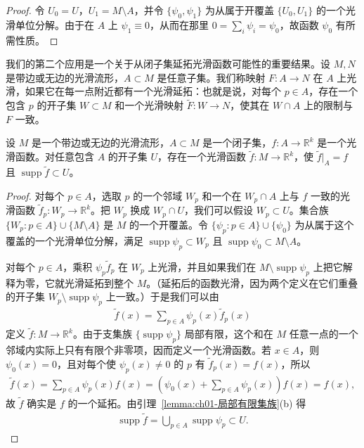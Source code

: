 \documentclass[../../main.tex]{subfiles}
\begin{document}
\begin{proof}
令 $U_{0}=U$，$U_{1}=M\setminus A$，并令 $\{\psi_{0},\psi_{1}\}$ 为从属于开覆盖 $\{U_{0},U_{1}\}$ 的一个光滑单位分解。由于在 $A$ 上 $\psi_{1}\equiv 0$，从而在那里 $0=\sum_{i}\psi_{i}=\psi_{0}$，故函数 $\psi_{0}$ 有所需性质。
\end{proof}

我们的第二个应用是一个关于从闭子集延拓光滑函数可能性的重要结果。设 $M,N$ 是带边或无边的光滑流形，$A\subset M$ 是任意子集。我们称映射 $F:A\to N$ 在 $A$ 上光滑，如果它在每一点附近都有一个光滑延拓：也就是说，对每个 $p\in A$，存在一个包含 $p$ 的开子集 $W\subset M$ 和一个光滑映射 $\widetilde{F}:W\to N$，使其在 $W\cap A$ 上的限制与 $F$ 一致。

\begin{lemma}[光滑函数的延拓引理]\label{lemma:ch02-延拓引理}
设 $M$ 是一个带边或无边的光滑流形，$A\subset M$ 是一个闭子集，$f:A\to\mathbb{R}^{k}$ 是一个光滑函数。对任意包含 $A$ 的开子集 $U$，存在一个光滑函数 $\widetilde{f}:M\to\mathbb{R}^{k}$，使 $\widetilde{f}|_{A}=f$ 且 $\operatorname{supp}\widetilde{f}\subset U$。
\end{lemma}

\begin{proof}
对每个 $p\in A$，选取 $p$ 的一个邻域 $W_{p}$ 和一个在 $W_{p}\cap A$ 上与 $f$ 一致的光滑函数 $\widetilde{f}_{p}:W_{p}\to\mathbb{R}^{k}$。把 $W_{p}$ 换成 $W_{p}\cap U$，我们可以假设 $W_{p}\subset U$。集合族 $\{W_{p}:p\in A\}\cup\{M\setminus A\}$ 是 $M$ 的一个开覆盖。令 $\{\psi_{p}:p\in A\}\cup\{\psi_{0}\}$ 为从属于这个覆盖的一个光滑单位分解，满足 $\operatorname{supp}\psi_{p}\subset W_{p}$ 且 $\operatorname{supp}\psi_{0}\subset M\setminus A$。

对每个 $p\in A$，乘积 $\psi_{p}\widetilde{f}_{p}$ 在 $W_{p}$ 上光滑，并且如果我们在 $M\setminus\operatorname{supp}\psi_{p}$ 上把它解释为零，它就光滑延拓到整个 $M$。（延拓后的函数光滑，因为两个定义在它们重叠的开子集 $W_{p}\setminus\operatorname{supp}\psi_{p}$ 上一致。）于是我们可以由
\begin{align*}
\widetilde{f}(x)=\sum_{p\in A}\psi_{p}(x)\widetilde{f}_{p}(x)
\end{align*}
定义 $\widetilde{f}:M\to\mathbb{R}^{k}$。由于支集族 $\{\operatorname{supp}\psi_{p}\}$ 局部有限，这个和在 $M$ 任意一点的一个邻域内实际上只有有限个非零项，因而定义一个光滑函数。若 $x\in A$，则 $\psi_{0}(x)=0$，且对每个使 $\psi_{p}(x)\neq 0$ 的 $p$ 有 $\widetilde{f}_{p}(x)=f(x)$，所以
\begin{align*}
\widetilde{f}(x)=\sum_{p\in A}\psi_{p}(x)f(x)=\left(\psi_{0}(x)+\sum_{p\in A}\psi_{p}(x)\right)f(x)=f(x),
\end{align*}
故 $\widetilde{f}$ 确实是 $f$ 的一个延拓。由引理~\cref{lemma:ch01-局部有限集族}(b) 得
\begin{align*}
\operatorname{supp}\widetilde{f}=\bigcup_{p\in A}\operatorname{supp}\psi_{p}\subset U.
\end{align*}
\end{proof}
\end{document}
